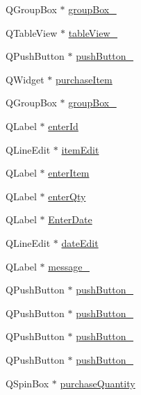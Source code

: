 \begin{DoxyCompactItemize}
\item 
Q\+Group\+Box $\ast$ \hyperlink{class_ui___main_window_ab4e705be60695a7d3a7b48ab511b197d}{group\+Box\+\_}
\item 
Q\+Table\+View $\ast$ \hyperlink{class_ui___main_window_aa17be36eedb7ac552187947b0f344c98}{table\+View\+\_}
\item 
Q\+Push\+Button $\ast$ \hyperlink{class_ui___main_window_a4dfd9764cd001543080d3041e1cf6d84}{push\+Button\+\_}
\item 
Q\+Widget $\ast$ \hyperlink{class_ui___main_window_ace97a68fd3b05ed882363ad2a2e8ca91}{purchase\+Item}
\item 
Q\+Group\+Box $\ast$ \hyperlink{class_ui___main_window_a32eaac1093b5253e7ce427e0db8a65d6}{group\+Box\+\_}
\item 
Q\+Label $\ast$ \hyperlink{class_ui___main_window_a223a5916d96e3c2b56d268906abfbf52}{enter\+Id}
\item 
Q\+Line\+Edit $\ast$ \hyperlink{class_ui___main_window_a1d31e2298db9fc4ff69ee1e692716312}{item\+Edit}
\item 
Q\+Label $\ast$ \hyperlink{class_ui___main_window_a44816dd975b9052e6b98fc4eb17e8b49}{enter\+Item}
\item 
Q\+Label $\ast$ \hyperlink{class_ui___main_window_a0ab1522a5178491caae189940c8bd31d}{enter\+Qty}
\item 
Q\+Label $\ast$ \hyperlink{class_ui___main_window_ac9b5264aada153c5366c4bf07a32afb0}{Enter\+Date}
\item 
Q\+Line\+Edit $\ast$ \hyperlink{class_ui___main_window_a898fb8f8bf924b51f2b3f9e349734d39}{date\+Edit}
\item 
Q\+Label $\ast$ \hyperlink{class_ui___main_window_a54e002dd96a23d4162d780dac271fa7d}{message\+\_}
\item 
Q\+Push\+Button $\ast$ \hyperlink{class_ui___main_window_add995cdeccccc1dce7cbc7dffcf1e333}{push\+Button\+\_}
\item 
Q\+Push\+Button $\ast$ \hyperlink{class_ui___main_window_a4fdeaf6d0b7a5c39cce65ecd2704f1e3}{push\+Button\+\_}
\item 
Q\+Push\+Button $\ast$ \hyperlink{class_ui___main_window_aa77f55f03d24c1045a9ab779f7e351fa}{push\+Button\+\_}
\item 
Q\+Push\+Button $\ast$ \hyperlink{class_ui___main_window_a62c6fa3a2f430de84c63871550708467}{push\+Button\+\_}
\item 
Q\+Spin\+Box $\ast$ \hyperlink{class_ui___main_window_ae8f2ce42082029268ee09a91b1ddd3ed}{purchase\+Quantity}

\end{DoxyCompactItemize}
